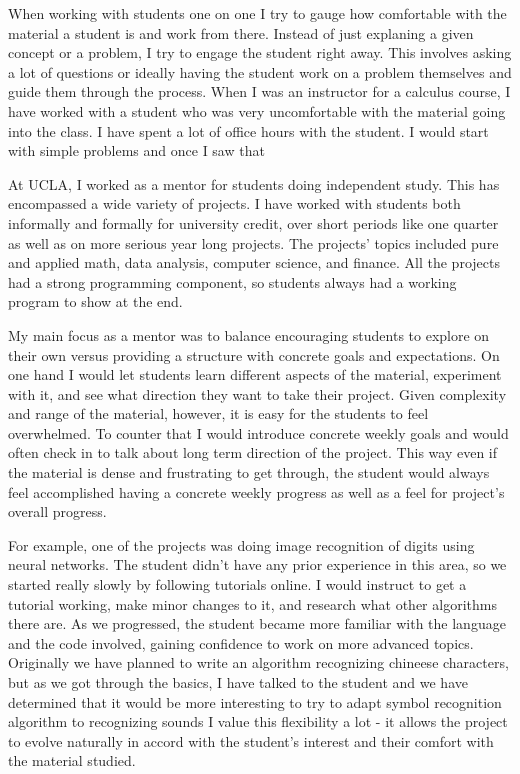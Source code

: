 \documentclass[11pt]{article}
\begin{document}
When working with students one on one I try to gauge how comfortable with the material a student is and work from there.
Instead of just explaning a given concept or a problem, I try to engage the student right away.
This involves asking a lot of questions or ideally having the student work on a problem themselves
and guide them through the process.
When I was an instructor for a calculus course, I have worked with a student who was very uncomfortable with the material going into the class.
I have spent a lot of office hours with the student.
I would start with simple problems and once I saw that 

At UCLA, I worked as a mentor for students doing independent study.
This has encompassed a wide variety of projects.
I have worked with students both informally and formally for university credit,
over short periods like one quarter as well as on more serious year long projects.
The projects' topics included pure and applied math, data analysis, computer science, and finance.
All the projects had a strong programming component, so students always had a working program to show at the end.

My main focus as a mentor was to balance encouraging students to explore on their own versus providing a structure with concrete goals and expectations.
On one hand I would let students learn different aspects of the material, experiment with it, and see what direction they want to take their project.
Given complexity and range of the material, however, it is easy for the students to feel overwhelmed.
To counter that I would introduce concrete weekly goals and would often check in to talk about long term direction of the project.
This way even if the material is dense and frustrating to get through, the student would always feel accomplished having a concrete weekly progress as well as a feel for project's overall progress.

For example, one of the projects was doing image recognition of digits using neural networks.
The student didn't have any prior experience in this area, so we started really slowly by following tutorials online.
I would instruct to get a tutorial working, make minor changes to it, and research what other algorithms there are.
As we progressed, the student became more familiar with the language and the code involved, gaining confidence to work on more advanced topics.
Originally we have planned to write an algorithm recognizing chineese characters,
but as we got through the basics, I have talked to the student and we have determined that it would be more interesting to try to adapt symbol recognition algorithm to recognizing sounds
I value this flexibility a lot - it allows the project to evolve naturally in accord with the student's interest and their comfort with the material studied.

	
\end{document}
